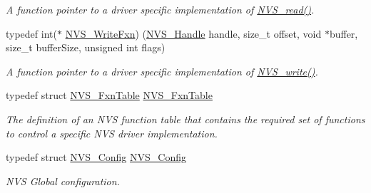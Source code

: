 \begin{DoxyCompactItemize}
\begin{DoxyCompactList}\small\item\em A function pointer to a driver specific implementation of \hyperlink{_n_v_s_8h_ac966d3124df42478325b6a2f4def117b}{N\+V\+S\+\_\+read()}. \end{DoxyCompactList}\item 
typedef int($\ast$ \hyperlink{_n_v_s_8h_ad512db474e5833af4330fb57095c7fca}{N\+V\+S\+\_\+\+Write\+Fxn}) (\hyperlink{_n_v_s_8h_a1ee0bd7b3cd443236454a8cb1f56ad44}{N\+V\+S\+\_\+\+Handle} handle, size\+\_\+t offset, void $\ast$buffer, size\+\_\+t buffer\+Size, unsigned int flags)
\begin{DoxyCompactList}\small\item\em A function pointer to a driver specific implementation of \hyperlink{_n_v_s_8h_a2c0acbdec0a65dc725019adb65ad282a}{N\+V\+S\+\_\+write()}. \end{DoxyCompactList}\item 
typedef struct \hyperlink{struct_n_v_s___fxn_table}{N\+V\+S\+\_\+\+Fxn\+Table} \hyperlink{_n_v_s_8h_a54257fb6f2f9762bcc8bb3d6ce27cde8}{N\+V\+S\+\_\+\+Fxn\+Table}
\begin{DoxyCompactList}\small\item\em The definition of an N\+V\+S function table that contains the required set of functions to control a specific N\+V\+S driver implementation. \end{DoxyCompactList}\item 
typedef struct \hyperlink{struct_n_v_s___config}{N\+V\+S\+\_\+\+Config} \hyperlink{_n_v_s_8h_ac19e1a4723b1faf8a7f419d2abf7e8e6}{N\+V\+S\+\_\+\+Config}
\begin{DoxyCompactList}\small\item\em N\+V\+S Global configuration. \end{DoxyCompactList}\end{DoxyCompactItemize}
